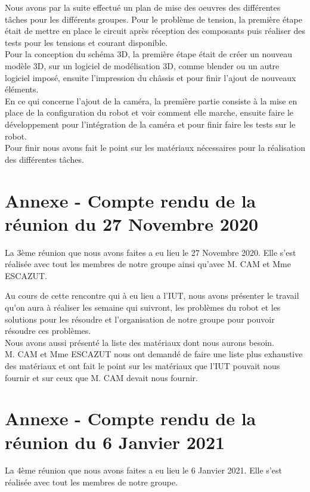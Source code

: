 \documentclass{PackagerQualityN}
\begin{document}
Nous avons par la suite effectué un plan de mise des oeuvres des différentes tâches pour les différents groupes.
Pour le problème de tension, la première étape était de mettre en place le circuit après réception des composants puis réaliser des tests pour les tensions et courant disponible.
\\
Pour la conception du schéma 3D, la première étape était de créer un nouveau modèle 3D, sur un logiciel de modélisation 3D, comme blender ou un autre logiciel imposé, ensuite l'impression du châssis et pour finir l'ajout de nouveaux éléments.
\\
En ce qui concerne l'ajout de la caméra, la première partie consiste à la mise en place de la configuration du robot et voir comment elle marche, ensuite faire le développement pour l'intégration de la caméra et pour finir faire les tests sur le robot.
\\
Pour finir nous avons fait le point sur les matériaux nécessaires pour la réalisation des différentes tâches.

\newp
\section{Annexe - Compte rendu de la réunion du 27 Novembre 2020}
La 3ème réunion que nous avons faites a eu lieu le 27 Novembre 2020. Elle s'est réalisée avec tout les membres de notre groupe ainsi qu'avec M. CAM et Mme ESCAZUT.

Au cours de cette rencontre qui à eu lieu a l'IUT, nous avons présenter le travail qu'on aura à réaliser les semaine qui suivront, les problèmes du robot et les solutions pour les résoudre et l'organisation de notre groupe pour pouvoir résoudre ces problèmes.
\\

Nous avons aussi présenté la liste des matériaux dont nous aurons besoin.
\\

M. CAM et Mme ESCAZUT nous ont demandé de faire une liste plus exhaustive des matériaux et ont fait le point sur les matériaux que l'IUT pouvait nous fournir et sur ceux que M. CAM devait nous fournir.


\newp
\section{Annexe - Compte rendu de la réunion du 6 Janvier 2021}
La 4ème réunion que nous avons faites a eu lieu le 6 Janvier 2021. Elle s'est réalisée avec tout les membres de notre groupe.
\end{document}
